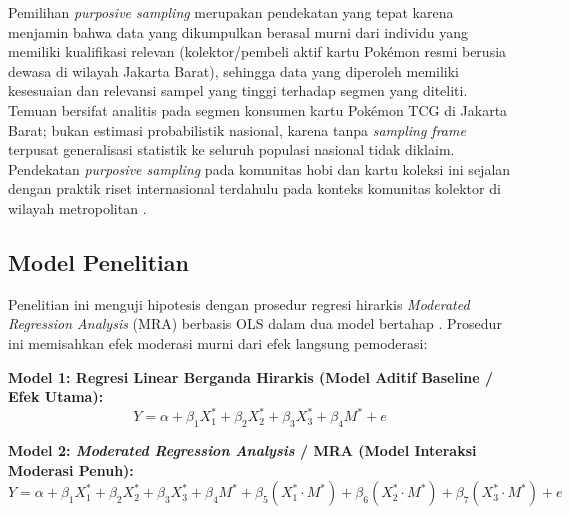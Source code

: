 \documentclass[12pt,a4paper]{article}
\numberwithin{equation}{section}
\numberwithin{table}{section}
\numberwithin{figure}{section}
\begin{document}
Pemilihan \emph{purposive sampling} merupakan pendekatan yang tepat karena menjamin bahwa data yang dikumpulkan berasal murni dari individu yang memiliki kualifikasi relevan (kolektor/pembeli aktif kartu Pok\'emon resmi berusia dewasa di wilayah Jakarta Barat), sehingga data yang diperoleh memiliki kesesuaian dan relevansi sampel yang tinggi terhadap segmen yang diteliti. Temuan bersifat analitis pada segmen konsumen kartu Pok\'emon TCG di Jakarta Barat; bukan estimasi probabilistik nasional, karena tanpa \emph{sampling frame} terpusat generalisasi statistik ke seluruh populasi nasional tidak diklaim. Pendekatan \emph{purposive sampling} pada komunitas hobi dan kartu koleksi ini sejalan dengan praktik riset internasional terdahulu pada konteks komunitas kolektor di wilayah metropolitan \citep{aryadi2024personal}.

\subsection{Model Penelitian}

Penelitian ini menguji hipotesis dengan prosedur regresi hirarkis \emph{Moderated Regression Analysis} (MRA) berbasis OLS dalam dua model bertahap \citep{aiken1991multiple, cohen1988statistical, hayes2018introduction}. Prosedur ini memisahkan efek moderasi murni dari efek langsung pemoderasi:

\noindent\textbf{Model 1: Regresi Linear Berganda Hirarkis (Model Aditif Baseline / Efek Utama):}
\begin{equation}
  Y = \alpha + \beta_1 X_1^* + \beta_2 X_2^* + \beta_3 X_3^* + \beta_4 M^* + e
  \label{eq:model1_regresi}
\end{equation}

\noindent\textbf{Model 2: \emph{Moderated Regression Analysis} / MRA (Model Interaksi Moderasi Penuh):}
\begin{equation}
  Y = \alpha + \beta_1 X_1^* + \beta_2 X_2^* + \beta_3 X_3^* + \beta_4 M^* + \beta_5 (X_1^* \cdot M^*) + \beta_6 (X_2^* \cdot M^*) + \beta_7 (X_3^* \cdot M^*) + e
  \label{eq:model2_mra}
\end{equation}
\end{document}
